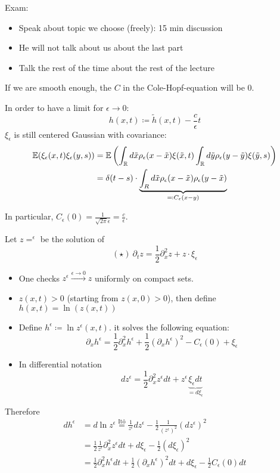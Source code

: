 
Exam:
\begin{itemize}
    \item Speak about topic we choose (freely): 15 min discussion
    \item He will not talk about us about the last part 
    \item Talk the rest of the time about the rest of the lecture
\end{itemize}

If we are smooth enough, the $C$ in the Cole-Hopf-equation will be $0$.

In order to have a limit for $\epsilon\to0$:
\[h(x,t)\coloneqq \tilde{h}(x,t)-\frac{c}{\epsilon}t\]
$\xi_\epsilon$ is still centered Gaussian with covariance:
\begin{align*}
    \mathbb{E}(\xi_\epsilon(x,t)\xi_\epsilon(y,s))&=\mathbb{E}\left(\int_{\mathbb{R}} d\tilde{x}\rho_\epsilon(x-\tilde{x})\xi(\tilde{x},t)\int_{\mathbb{R}} d\tilde{y}\rho_\epsilon(y-\tilde{y})\xi(\tilde{y},s)\right)\\
    &=\delta(t-s)\cdot\underbrace{\int_{R}d\tilde{x}\rho_\epsilon(x-\tilde{x})\rho_\epsilon(y-\tilde{x})}_{\eqqcolon C_\epsilon(x-y)}
\end{align*}

In particular, $C_\epsilon(0)=\frac{1}{\sqrt{2\pi}\epsilon}=\frac{c}{\epsilon}$.

Let $z=^\epsilon$ be the solution of 
\[(\star)\ \partial_tz=\frac{1}{2}\partial_x^2 z+ z\cdot \xi_\epsilon\]
\begin{itemize}
    \item One checks $z^\epsilon\stackrel{\epsilon\to0}{\to}z$ uniformly on compact sets.
    \item $z(x,t)>0$ (starting from $z(x,0)>0$), then define $h(x,t)=\ln(z(x,t))$
    \item Define $h^\epsilon\coloneq \ln z^\epsilon(x,t)$. it solves the following equation:\[\partial_x h^\epsilon=\frac{1}{2}\partial_x^2h^\epsilon+\frac{1}{2}(\partial_x h^\epsilon)^2-C_\epsilon(0)+\xi_\epsilon\]
    \item In differential notation \[d z^\epsilon = \frac{1}{2}\partial_x^2 z^\epsilon dt+z^\epsilon \underbrace{\xi_\epsilon dt}_{=d\xi_\epsilon}\]
\end{itemize}

Therefore \begin{align*}
    dh^\epsilon&=d\ln z^\epsilon\stackrel{\text{Itô}}{=}\frac{1}{z^\epsilon}dz^\epsilon-\frac{1}{2}\frac{1}{(z^\epsilon)^2}(dz^\epsilon)^2\\
    &=\frac{1}{2}\frac{1}{z^\epsilon}\partial_x^2z^\epsilon dt +d\xi_\epsilon-\frac{1}{2}(d\xi_\epsilon)^2\\
    &=\frac{1}{2}\partial_x^2 h^\epsilon dt + \frac{1}{2}(\partial_x h^\epsilon)^2dt + d\xi_\epsilon-\frac{1}{2}C_\epsilon(0) dt
\end{align*}

